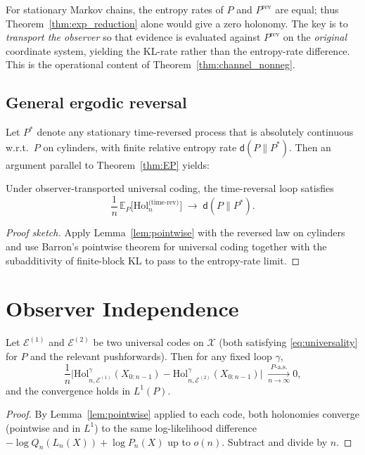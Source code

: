 \documentclass[11pt]{article}
\newcommand{\X}{\mathcal{X}}
\newcommand{\E}{\mathbb{E}}
\newcommand{\1}{\mathbbm{1}}
\newcommand{\code}{\mathcal{E}}
\begin{document}
\begin{remark}
For stationary Markov chains, the entropy rates of $P$ and $P^\mathrm{rev}$ are equal; thus Theorem~\ref{thm:exp_reduction} alone would give a zero holonomy.
The key is to \emph{transport the observer} so that evidence is evaluated against $P^\mathrm{rev}$ on the \emph{original} coordinate system, yielding the KL-rate rather than the entropy-rate difference.
This is the operational content of Theorem~\ref{thm:channel_nonneg}.
\end{remark}

\subsection{General ergodic reversal}

Let $P^\ast$ denote any stationary time-reversed process that is absolutely continuous w.r.t.\ $P$ on cylinders, with finite relative entropy rate $\mathsf{d}(P\|P^\ast)$.
Then an argument parallel to Theorem~\ref{thm:EP} yields:

\begin{proposition}\label{prop:general_reversal}
Under observer-transported universal coding, the time-reversal loop satisfies
\[
\frac{1}{n}\,\E_P\big[\mathrm{Hol}_n^{\text{(time-rev)}}\big] \;\to\; \mathsf{d}(P\|P^\ast).
\]
\end{proposition}
\begin{proof}[Proof sketch]
Apply Lemma~\ref{lem:pointwise} with the reversed law on cylinders and use Barron's pointwise theorem for universal coding together with the subadditivity of finite-block KL to pass to the entropy-rate limit.
\end{proof}

\section{Observer Independence}

\begin{theorem}\label{thm:observer_ind}
Let $\code^{(1)}$ and $\code^{(2)}$ be two universal codes on $\X$ (both satisfying \eqref{eq:universality} for $P$ and the relevant pushforwards).
Then for any fixed loop $\gamma$,
\[
\frac{1}{n}\Big|\mathrm{Hol}_{n,\code^{(1)}}^\gamma(X_{0:n-1}) - \mathrm{Hol}_{n,\code^{(2)}}^\gamma(X_{0:n-1})\Big| \;\xrightarrow[n\to\infty]{P\text{-a.s.}} 0,
\]
and the convergence holds in $L^1(P)$.
\end{theorem}
\begin{proof}
By Lemma~\ref{lem:pointwise} applied to each code, both holonomies converge (pointwise and in $L^1$) to the same log-likelihood difference $-\log Q_n(L_n(X))+\log P_n(X)$ up to $o(n)$.
Subtract and divide by $n$.
\end{proof}
\end{document}
